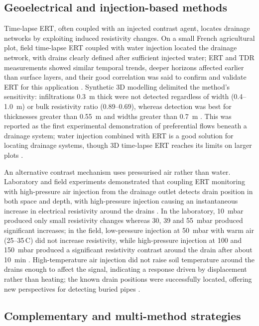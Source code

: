 \documentclass[11pt]{article}
\begin{document}
\subsection{Geoelectrical and injection-based methods}

Time-lapse ERT, often coupled with an injected contrast agent, locates drainage networks by exploiting induced resistivity changes. On a small French agricultural plot, field time-lapse ERT coupled with water injection located the drainage network, with drains clearly defined after sufficient injected water; ERT and TDR measurements showed similar temporal trends, deeper horizons affected earlier than surface layers, and their good correlation was said to confirm and validate ERT for this application \parencite{Jouen2018}. Synthetic 3D modelling delimited the method's sensitivity: infiltrations 0.3~m thick were not detected regardless of width (0.4--1.0~m) or bulk resistivity ratio (0.89--0.69), whereas detection was best for thicknesses greater than 0.55~m and widths greater than 0.7~m \parencite{Jouen2018}. This was reported as the first experimental demonstration of preferential flows beneath a drainage system; water injection combined with ERT is a good solution for locating drainage systems, though 3D time-lapse ERT reaches its limits on larger plots \parencite{Jouen2018}.

An alternative contrast mechanism uses pressurised air rather than water. Laboratory and field experiments demonstrated that coupling ERT monitoring with high-pressure air injection from the drainage outlet detects drain position in both space and depth, with high-pressure injection causing an instantaneous increase in electrical resistivity around the drains \parencite{Henine2021}. In the laboratory, 10~mbar produced only small resistivity changes whereas 30, 39 and 55~mbar produced significant increases; in the field, low-pressure injection at 50~mbar with warm air (25--35\,\textdegree C) did not increase resistivity, while high-pressure injection at 100 and 150~mbar produced a significant resistivity contrast around the drain after about 10~min \parencite{Henine2021}. High-temperature air injection did not raise soil temperature around the drains enough to affect the signal, indicating a response driven by displacement rather than heating; the known drain positions were successfully located, offering new perspectives for detecting buried pipes \parencite{Henine2021}.

\subsection{Complementary and multi-method strategies}
\end{document}
